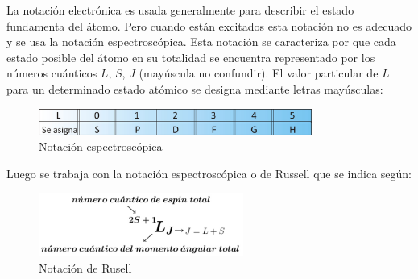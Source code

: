 La notación electrónica es usada generalmente para describir el estado fundamenta del átomo. Pero cuando están excitados esta notación no es adecuado y se usa la notación espectroscópica. Esta notación se caracteriza por que cada estado posible del átomo en su totalidad se encuentra representado por los números cuánticos $L$, $S$, $J$ (mayúscula no confundir). El valor particular de $L$ para un determinado estado atómico se designa mediante letras mayúsculas:

\begin{figure}[H]
    \centering
    \includegraphics[width=0.8\textwidth]{./Figures/LSeAsigna}
	\caption{Notación espectroscópica}
	\label{fig:LSeAsigna}
\end{figure}

Luego se trabaja con la notación espectroscópica o de Russell que se indica según:

\begin{figure}[H]
    \centering
    \includegraphics[width=0.6\textwidth]{./Figures/NotacionEspectroscopica}
	\caption{Notación de Rusell}
	\label{fig:NotacionEspectroscopica}
\end{figure}

